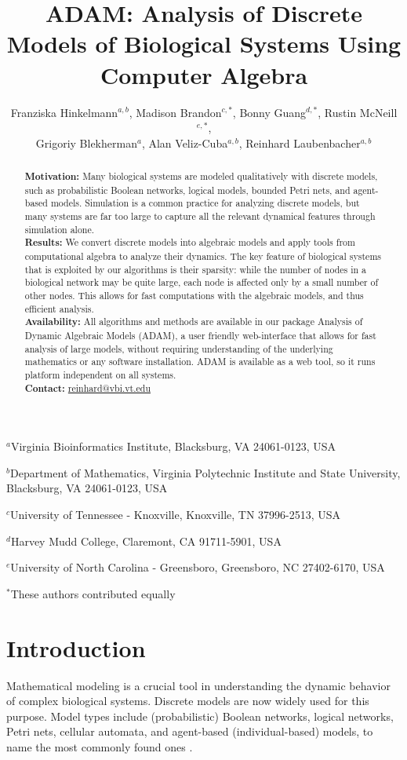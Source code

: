 \documentclass[11pt]{amsart}
\title{ADAM: Analysis of Discrete Models of Biological
Systems Using Computer Algebra}
\author{Franziska Hinkelmann$^{a,b}$,
Madison Brandon$^{c,*}$,
Bonny Guang$^{d,*}$,
Rustin McNeill$^{e,*}$, \\
Grigoriy Blekherman$^{a}$,
Alan Veliz-Cuba$^{a,b}$,
Reinhard Laubenbacher$^{a,b}$}
\begin{document}
\maketitle
{\footnotesize
              \centerline{$^a$Virginia Bioinformatics Institute, Blacksburg, VA 24061-0123, USA}
}
{\footnotesize
              \centerline{$^b$Department of Mathematics,
               Virginia Polytechnic Institute and State University, Blacksburg, VA 24061-0123, USA}
}
{\footnotesize
              \centerline{$^c$University of Tennessee - Knoxville, Knoxville, TN 37996-2513, USA}
}
{\footnotesize
              \centerline{$^d$Harvey Mudd College, Claremont, CA 91711-5901, USA}
}
{\footnotesize
              \centerline{$^e$University of North Carolina - Greensboro, Greensboro, NC 27402-6170, USA}
}
{\footnotesize
              \centerline{$^*$These authors contributed equally}
}
\begin{abstract}
{\bf Motivation:} Many biological systems are modeled qualitatively with discrete models, such as
probabilistic Boolean networks, logical models, bounded Petri nets, and agent-based models.
Simulation is a common practice for analyzing discrete models, but many systems are far too large
to capture all the relevant dynamical features through simulation alone. \\
{\bf Results:} We convert discrete models into algebraic models
and apply tools from computational algebra to analyze their dynamics.
The key feature of biological systems that is exploited by our algorithms is their sparsity: while the number of nodes in a
biological network may be quite large, each node is affected only by a small number of other nodes.
This allows for fast
computations with the algebraic models, and thus efficient analysis.\\
{\bf Availability:} All algorithms and methods are available in our package Analysis of Dynamic
Algebraic Models (ADAM), a user friendly web-interface
that allows for fast analysis of large models, without requiring understanding of the underlying mathematics or any software installation. ADAM is available as a web tool, so it runs platform independent on all systems.\\
{\bf Contact:} \href{mailto:reinhard@vbi.vt.edu}{reinhard@vbi.vt.edu}\\
\end{abstract}
\section{Introduction}
Mathematical modeling is a crucial tool in understanding the dynamic behavior of complex
biological systems. Discrete models are now widely used for this purpose.  Model types include
(probabilistic) Boolean networks, logical networks, Petri nets, cellular
automata, and agent-based (individual-based) models, to name the most commonly found ones \cite{Steggles, heiner-petri, shmulevich, Chaouiya, cell-automata, springer_book}.
 
\end{document}
